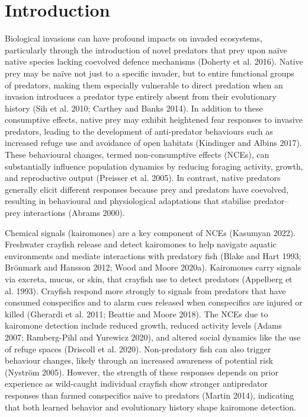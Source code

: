 \documentclass[
  12pt,
  a4paper,
  oneside]{scrbook}
\begin{document}
\section{Introduction}\label{introduction}

Biological invasions can have profound impacts on invaded ecosystems,
particularly through the introduction of novel predators that prey upon
naïve native species lacking coevolved defence mechanisms (Doherty et
al. 2016). Native prey may be naïve not just to a specific invader, but
to entire functional groups of predators, making them especially
vulnerable to direct predation when an invasion introduces a predator
type entirely absent from their evolutionary history (Sih et al. 2010;
Carthey and Banks 2014). In addition to these consumptive effects,
native prey may exhibit heightened fear responses to invasive predators,
leading to the development of anti-predator behaviours such as increased
refuge use and avoidance of open habitats (Kindinger and Albins 2017).
These behavioural changes, termed non-consumptive effects (NCEs), can
substantially influence population dynamics by reducing foraging
activity, growth, and reproductive output (Preisser et al. 2005). In
contrast, native predators generally elicit different responses because
prey and predators have coevolved, resulting in behavioural and
physiological adaptations that stabilise predator--prey interactions
(Abrams 2000).

Chemical signals (kairomones) are a key component of NCEs (Kasumyan
2022). Freshwater crayfish release and detect kairomones to help
navigate aquatic environments and mediate interactions with predatory
fish (Blake and Hart 1993; Brönmark and Hansson 2012; Wood and Moore
2020a). Kairomones carry signals via excreta, mucus, or skin, that
crayfish use to detect predators (Appelberg et al. 1993). Crayfish
respond more strongly to signals from predators that have consumed
conspecifics and to alarm cues released when conspecifics are injured or
killed (Gherardi et al. 2011; Beattie and Moore 2018). The NCEs due to
kairomone detection include reduced growth, reduced activity levels
(Adams 2007; Ramberg-Pihl and Yurewicz 2020), and altered social
dynamics like the use of refuge spaces (Driscoll et al. 2020).
Non-predatory fish can also trigger behaviour changes, likely through an
increased awareness of potential risk (Nyström 2005). However, the
strength of these responses depends on prior experience as wild-caught
individual crayfish show stronger antipredator responses than farmed
conspecifics naïve to predators (Martin 2014), indicating that both
learned behavior and evolutionary history shape kairomone detection.
\end{document}
